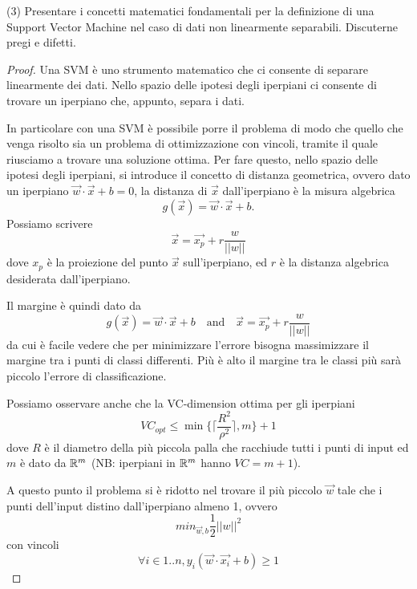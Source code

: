 \documentclass[12pt,a4paper,oneside]{book}
\begin{document}
\begin{exercise}{(3)}
    Presentare i concetti matematici fondamentali per la definizione
    di una Support Vector Machine nel caso di dati non linearmente
    separabili. Discuterne pregi e difetti.
    
    \begin{proof}
    	Una SVM è uno strumento matematico che ci consente di separare linearmente dei dati. Nello spazio delle ipotesi degli iperpiani ci consente di trovare un iperpiano che, appunto, separa i dati.
    	
    	In particolare con una SVM è possibile porre il problema di modo che quello che venga risolto sia un problema di ottimizzazione con vincoli, tramite il quale riusciamo a trovare una soluzione ottima. Per fare questo, nello spazio delle ipotesi degli iperpiani, si introduce il concetto di distanza geometrica, ovvero dato un iperpiano $\vec{w} \cdot \vec{x} + b = 0$, la distanza di $\vec{x}$ dall'iperpiano è la misura algebrica 
    	\[
    		g(\vec{x}) = \vec{w} \cdot \vec{x} + b.
    	\]
    	Possiamo scrivere 
    	\[
    		\vec{x} = \vec{x_p} + r \frac{w}{|| w ||}
    	\]
    	dove $x_p$ è la proiezione del punto $\vec{x}$ sull'iperpiano, ed $r$ è la distanza algebrica desiderata dall'iperpiano.
    	
    	Il margine è quindi dato da 
    	\[
    		g(\vec{x}) = \vec{w} \cdot \vec{x} + b \quad\text{and}\quad \vec{x} = \vec{x_p} + r \frac{w}{|| w ||}
    	\]
    	da cui è facile vedere che per minimizzare l'errore bisogna massimizzare il margine tra i punti di classi differenti. Più è alto il margine tra le classi più sarà piccolo l'errore di classificazione.
    	
    	Possiamo osservare anche che la VC-dimension ottima per gli iperpiani 
    	\[
    		VC_{opt} \leq \min \{ \lceil \frac{R^2}{\rho^2} \rceil, m \} + 1
   		\]
   		dove $R$ è il diametro della più piccola palla che racchiude tutti i punti di input ed $m$ è dato da $\mathbb{R}^m$ (NB: iperpiani in $\mathbb{R}^m$ hanno $VC=m+1$).
   		
   		A questo punto il problema si è ridotto nel trovare il più piccolo $\vec{w}$ tale che i punti dell'input distino dall'iperpiano almeno 1, ovvero
   		\[
   			min_{\vec{w},b} \frac{1}{2} ||w||^2
   		\]
   		con vincoli
   		\[
   			\forall i \in 1..n, y_i(\vec{w} \cdot \vec{x_i} + b) \geq 1
   		\]
   		

\end{proof}
\end{exercise}
\end{document}
